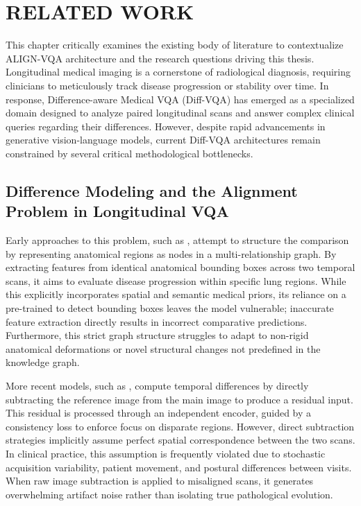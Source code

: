 \setlength{\footskip}{8mm}

\chapter{RELATED WORK}
This chapter critically examines the existing body of literature to contextualize ALIGN-VQA architecture and the research questions driving this thesis. Longitudinal medical imaging is a cornerstone of radiological diagnosis, requiring clinicians to meticulously track disease progression or stability over time. In response, Difference-aware Medical VQA (Diff-VQA) has emerged as a specialized domain designed to analyze paired longitudinal scans and answer complex clinical queries regarding their differences. However, despite rapid advancements in generative vision-language models, current Diff-VQA architectures remain constrained by several critical methodological bottlenecks.

\section{Difference Modeling and the Alignment Problem in Longitudinal VQA}
Early approaches to this problem, such as \cite{ekaid}, attempt to structure the comparison by representing anatomical regions as nodes in a multi-relationship graph. By extracting features from identical anatomical bounding boxes across two temporal scans, it aims to evaluate disease progression within specific lung regions. While this explicitly incorporates spatial and semantic medical priors, its reliance on a pre-trained \cite{faster-rcnn} to detect bounding boxes leaves the model vulnerable; inaccurate feature extraction directly results in incorrect comparative predictions. Furthermore, this strict graph structure struggles to adapt to non-rigid anatomical deformations or novel structural changes not predefined in the knowledge graph.

More recent models, such as \cite{real}, compute temporal differences by directly subtracting the reference image from the main image to produce a residual input. This residual is processed through an independent encoder, guided by a consistency loss to enforce focus on disparate regions. However, direct subtraction strategies implicitly assume perfect spatial correspondence between the two scans. In clinical practice, this assumption is frequently violated due to stochastic acquisition variability, patient movement, and postural differences between visits. When raw image subtraction is applied to misaligned scans, it generates overwhelming artifact noise rather than isolating true pathological evolution.

